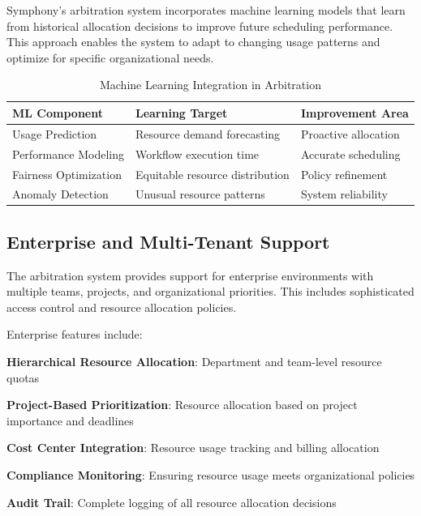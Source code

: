 Symphony's arbitration system incorporates machine learning models that learn from historical allocation decisions to improve future scheduling performance. This approach enables the system to adapt to changing usage patterns and optimize for specific organizational needs.

\begin{table}[ht]
\centering
\begin{tabular}{@{}lll@{}}
\toprule
\textbf{ML Component} & \textbf{Learning Target} & \textbf{Improvement Area} \\
\midrule
Usage Prediction & Resource demand forecasting & Proactive allocation \\
Performance Modeling & Workflow execution time & Accurate scheduling \\
Fairness Optimization & Equitable resource distribution & Policy refinement \\
Anomaly Detection & Unusual resource patterns & System reliability \\
\bottomrule
\end{tabular}
\caption{Machine Learning Integration in Arbitration}
\end{table}

\subsection*{Enterprise and Multi-Tenant Support}

The arbitration system provides support for enterprise environments with multiple teams, projects, and organizational priorities. This includes sophisticated access control and resource allocation policies.

Enterprise features include:

\begin{expandedlist}
    \item \textbf{Hierarchical Resource Allocation}: Department and team-level resource quotas
    \item \textbf{Project-Based Prioritization}: Resource allocation based on project importance and deadlines
    \item \textbf{Cost Center Integration}: Resource usage tracking and billing allocation
    \item \textbf{Compliance Monitoring}: Ensuring resource usage meets organizational policies
    \item \textbf{Audit Trail}: Complete logging of all resource allocation decisions
\end{expandedlist}

